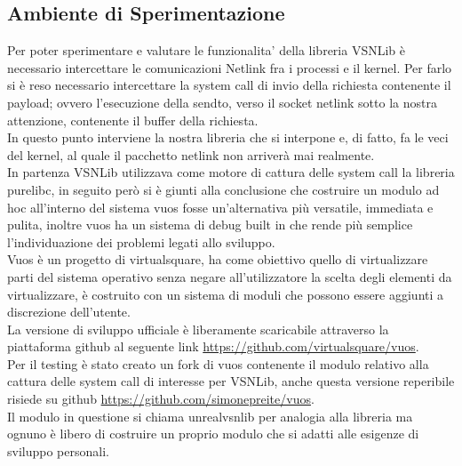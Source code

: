 \subsection{Ambiente di Sperimentazione}
Per poter sperimentare e valutare le funzionalita' della libreria VSNLib \`e necessario intercettare le comunicazioni Netlink fra i processi e il kernel.
Per farlo si \`e reso necessario intercettare la system call di invio della richiesta contenente il payload; ovvero l'esecuzione della sendto, verso il socket netlink sotto la nostra attenzione, contenente il buffer della richiesta.\\
In questo punto interviene la nostra libreria che si interpone e, di fatto, fa le veci del kernel, al quale il pacchetto netlink non arriver\`a mai realmente.\\
In partenza VSNLib utilizzava come motore di cattura delle system call la libreria purelibc\cite{K8}, in seguito per\`o si \`e giunti alla conclusione che costruire un modulo ad hoc all'interno del sistema vuos fosse un'alternativa pi\`u versatile, immediata e pulita, inoltre vuos ha un sistema di debug built in che rende pi\`u semplice l'individuazione dei problemi legati allo sviluppo.\\
Vuos\cite{K5} \`e un progetto di virtualsquare, ha come obiettivo quello di virtualizzare parti del sistema operativo senza negare all'utilizzatore la scelta degli elementi da virtualizzare, \`e costruito con un sistema di moduli che possono essere aggiunti a discrezione dell'utente.\\
La versione di sviluppo ufficiale \`e liberamente scaricabile attraverso la piattaforma github al seguente link \url{https://github.com/virtualsquare/vuos}. \\
Per il testing \`e stato creato un fork di vuos contenente il modulo relativo alla cattura delle system call di interesse per VSNLib, anche questa versione reperibile risiede su github \url{https://github.com/simonepreite/vuos}.\\
Il modulo in questione si chiama unrealvsnlib per analogia alla libreria ma ognuno \`e libero di costruire un proprio modulo che si adatti alle esigenze di sviluppo personali.\\

